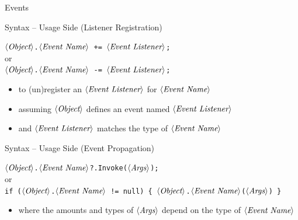 \documentclass[presentation]{beamer}
\newcommand{\cscat}[1]{$\langle\text{{\itshape#1}}\rangle$}
\begin{document}
\begin{frame}[allowframebreaks]{\dotnet Events}
  \begin{block}{Syntax -- Usage Side (Listener Registration)}
    \begin{center}
      \texttt{\cscat{Object}\alert{.}\cscat{Event Name} \alert{+=} \cscat{Event Listener};}
      \\
      or
      \\
      \texttt{\cscat{Object}\alert{.}\cscat{Event Name} \alert{-=} \cscat{Event Listener};}
    \end{center}
    \begin{itemize}
      \item to (un)register an \texttt{\cscat{Event Listener}} for \texttt{\cscat{Event Name}}
      \item assuming \texttt{\cscat{Object}} defines an event named \texttt{\cscat{Event Listener}}
      \item and \texttt{\cscat{Event Listener}} matches the type of \texttt{\cscat{Event Name}}
    \end{itemize}
  \end{block}

  \begin{block}{Syntax -- Usage Side (Event Propagation)}
    \begin{center}
      \texttt{\cscat{Object}.\cscat{Event Name}\alert{?.}Invoke(\cscat{Args});}
      \\
      or
      \\
      \texttt{if (\cscat{Object}.\cscat{Event Name} != null) \{ \cscat{Object}\alert{.}\cscat{Event Name}(\cscat{Args}) \}}
    \end{center}
    \begin{itemize}
      \item where the amounts and types of \texttt{\cscat{Args}} depend on the type of \texttt{\cscat{Event Name}}
    \end{itemize}
  \end{block}

\end{frame}
\end{document}
